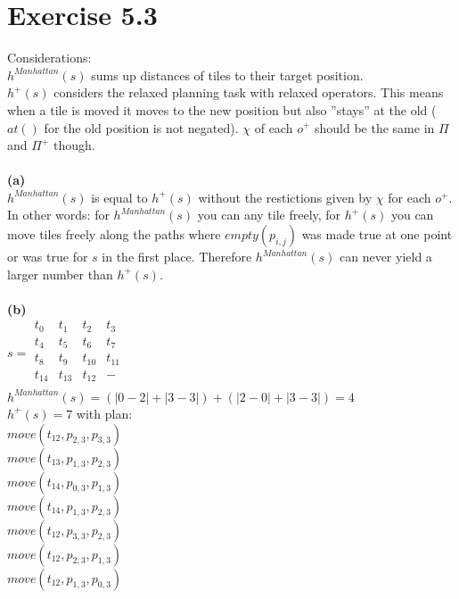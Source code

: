\documentclass[11pt,a4paper]{article}
\begin{document}
\section*{Exercise 5.3}
Considerations:\\
$h^{Manhattan}(s)$ sums up distances of tiles to their target position.\\
$h^+(s)$ considers the relaxed planning task with relaxed operators. This means when a tile is moved it moves to the new position but also ''stays'' at the old ($at()$ for the old position is not negated). $\chi$ of each $o^+$ should be the same in $\Pi$ and $\Pi^+$ though.\\
\\
\textbf{(a)}\\
$h^{Manhattan}(s)$ is equal to $h^+(s)$ without the restictions given by $\chi$ for each $o^+$. In other words: for $h^{Manhattan}(s)$ you can any tile freely, for $h^+(s)$ you can move tiles freely along the paths where $empty(p_{i,j})$ was made true at one point or was true for $s$ in the first place. Therefore $h^{Manhattan}(s)$ can never yield a larger number than $h^+(s)$.\\
\\
\textbf{(b)}\\
$s = \begin{matrix}
t_0 & t_1 & t_2 & t_3 \\
t_4 & t_5 & t_6 & t_7 \\
t_8 & t_9 & t_{10} & t_{11} \\
t_{14} & t_{13} & t_{12} & - \\
\end{matrix}$\\
$h^{Manhattan}(s)=(|0-2|+|3-3|)+(|2-0|+|3-3|)=4$\\
$h^+(s)=7$ with plan:\\ %
$move(t_{12},p_{2,3},p_{3,3})$\\
$move(t_{13},p_{1,3},p_{2,3})$\\
$move(t_{14},p_{0,3},p_{1,3})$\\
$move(t_{14},p_{1,3},p_{2,3})$\\
$move(t_{12},p_{3,3},p_{2,3})$\\
$move(t_{12},p_{2,3},p_{1,3})$\\
$move(t_{12},p_{1,3},p_{0,3})$
\end{document}

